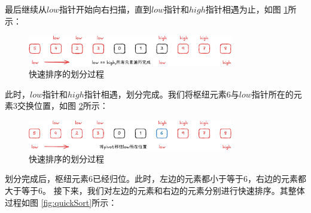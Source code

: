 \documentclass[lang=cn,newtx,10pt,scheme=chinese]{elegantbook}
\begin{document}
最后继续从$low$指针开始向右扫描，直到$low$指针和$high$指针相遇为止，如图 \ref{fig:patition_h}所示：

\begin{figure}
[h!]
    \centering
    \includegraphics[width=0.8\textwidth]{./figure/pdf/cropped/patition_h.pdf}
    \caption{快速排序的划分过程}
    \label{fig:patition_h}
\end{figure}

此时，$low$指针和$high$指针相遇，划分完成。我们将枢纽元素6与$low$指针所在的元素3交换位置，如图 \ref{fig:patition_i}所示：

\begin{figure}
[h!]
    \centering
    \includegraphics[width=0.8\textwidth]{./figure/pdf/cropped/patition_i.pdf}
    \caption{快速排序的划分过程}
    \label{fig:patition_i}
\end{figure}


划分完成后，枢纽元素6已经归位。此时，左边的元素都小于等于6，右边的元素都大于等于6。
接下来，我们对左边的元素和右边的元素分别进行快速排序。其整体过程如图 \ref{fig:quickSort}所示：
\end{document}
